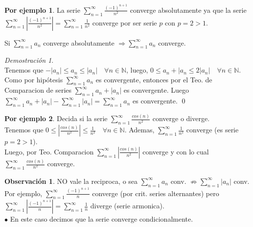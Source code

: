 \documentclass{article}
\theoremstyle{definition}
\newtheorem*{obs}{Observación}
\newtheorem*{ej}{Por ejemplo}
\theoremstyle{remark}
\newtheorem*{demo}{Demostración}
\begin{document}
\begin{ej}
  La serie $\sum_{n=1}^{\infty}{\frac{(-1)^{n+1}}{n^2}}$ converge absolutamente ya que la serie\\
  $\sum_{n=1}^{\infty}{\left\vert\frac{(-1)^{n+1}}{n^2}\right\vert} = \sum_{n=1}^{\infty}{\frac{1}{n^2}}$ converge por ser serie $p$ con $p=2>1$.
\end{ej}

\begin{teo}
  Si $\sum_{n=1}^{\infty}{a_n}$ converge absolutamente $\Longrightarrow \sum_{n=1}^{\infty}{a_n}$ converge.
\end{teo}

\begin{demo} \; \\
  Tenemos que $-|a_n| \leq a_n \leq |a_n| \quad \forall n \in \mathbb{N}$, luego, $0 \leq a_n + |a_n \leq 2 |a_n| \quad \forall n \in \mathbb{N}$. Como por hipótesis $\sum_{n=1}^{\infty}{a_n}$ es convergente, entonces por el Teo. de Comparacion de series $\sum_{n=1}^{\infty}{a_n+|a_n|}$ es convergente. Luego $\sum_{n=1}^{\infty}{a_n+|a_n|}-\sum_{n=1}^{\infty}{|a_n|}=\sum_{n=1}^{\infty}{a_n}$ es convergente. \qed
\end{demo}


\begin{ej}
  Decida si la serie $\sum_{n=1}^{\infty}{\frac{cos(n)}{n^2}}$ converge o diverge. \\
  Tenemos que $0 \leq \left| \frac{cos(n)}{n^2} \right| \leq \frac{1}{n^2} \quad \forall n \in \mathbb{N}$. Ademas, $\sum_{n=1}^{\infty}{\frac{1}{n^2}}$ converge (es serie $p=2>1$). \\
  Luego, por Teo. Comparacion $\sum_{n=1}^{\infty}{\left| \frac{cos(n)}{n^2} \right|}$ converge y con lo cual $\sum_{n=1}^{\infty}{\frac{cos(n)}{n^2}}$ converge.
\end{ej}

\begin{obs}
  NO vale la reciproca, o sea $\sum_{n=1}^{\infty}{a_n}$ conv. $\not\Rightarrow \sum_{n=1}^{\infty}{|a_n|}$ conv. \\
  Por ejemplo, $\sum_{n=1}^{\infty}{\frac{(-1)^{n+1}}{n}}$ converge (por crit. series alternantes) pero \\ $\sum_{n=1}^{\infty}{ \left| \frac{(-1)^{n+1}}{n} \right|} = \sum_{n=1}^{\infty}{\frac{1}{n}}$ diverge (serie armonica). \\
  $\bullet$ \quad En este caso decimos que la serie converge condicionalmente.
\end{obs}
\end{document}
